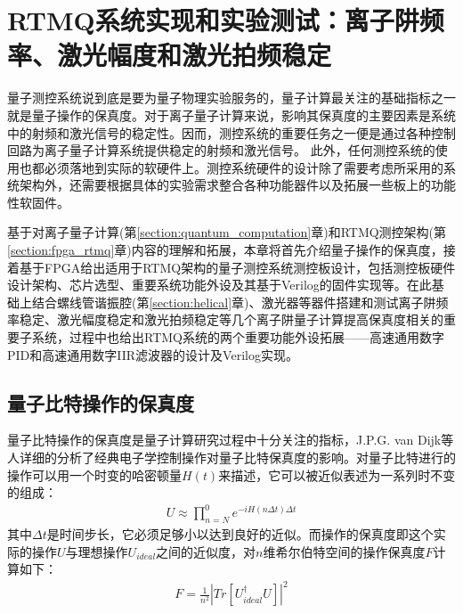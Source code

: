 

\chapter[RTMQ系统实现和实验测试：离子阱频率、激光幅度和激光拍频稳定]{RTMQ系统实现和实验测试：离子阱频率、激光幅度和激光拍频稳定\label{section:implementation}}

量子测控系统说到底是要为量子物理实验服务的，量子计算最关注的基础指标之一就是量子操作的保真度。对于离子量子计算来说，影响其保真度的主要因素是系统中的射频和激光信号的稳定性。因而，测控系统的重要任务之一便是通过各种控制回路为离子量子计算系统提供稳定的射频和激光信号。
此外，任何测控系统的使用也都必须落地到实际的软硬件上。测控系统硬件的设计除了需要考虑所采用的系统架构外，还需要根据具体的实验需求整合各种功能器件以及拓展一些板上的功能性软固件。

基于对离子量子计算(第\ref{section:quantum_computation}章)和RTMQ测控架构(第\ref{section:fpga_rtmq}章)内容的理解和拓展，本章将首先介绍量子操作的保真度，接着基于FPGA给出适用于RTMQ架构的量子测控系统测控板设计，包括测控板硬件设计架构、芯片选型、重要系统功能外设及其基于Verilog的固件实现等。在此基础上结合螺线管谐振腔(第\ref{section:helical}章)、激光器等器件搭建和测试离子阱频率稳定、激光幅度稳定和激光拍频稳定等几个离子阱量子计算提高保真度相关的重要子系统，过程中也给出RTMQ系统的两个重要功能外设拓展——高速通用数字PID和高速通用数字IIR滤波器的设计及Verilog实现。






\section[量子比特操作的保真度]{量子比特操作的保真度}


量子比特操作的保真度是量子计算研究过程中十分关注的指标，J.P.G. van Dijk等人\cite[]{van_Dijk_Kawakami_Schouten_Veldhorst_Vandersypen_Babaie_Charbon_Sebastiano_2019}详细的分析了经典电子学控制操作对量子比特保真度的影响。对量子比特进行的操作可以用一个时变的哈密顿量$H(t)$来描述，它可以被近似表述为一系列时不变的组成：
\begin{align}
    U\approx \prod_{n=N}^{0} e^{-iH(n\Delta t)\Delta t}
\end{align}
其中$\Delta t$是时间步长，它必须足够小以达到良好的近似。而操作的保真度即这个实际的操作$U$与理想操作$U_{ideal}$之间的近似度，对$n$维希尔伯特空间的操作保真度$F$计算如下：
\begin{align}
    F=\frac{1}{n^2}\left|Tr\left[U_{ideal}^{\dagger}U\right]\right|^2
\end{align}

